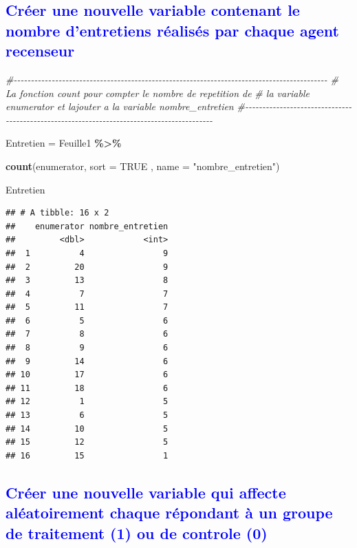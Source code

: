 \documentclass[
]{article}
\newenvironment{Shaded}{\begin{snugshade}}{\end{snugshade}}
\newcommand{\AttributeTok}[1]{\textcolor[rgb]{0.13,0.29,0.53}{#1}}
\newcommand{\CommentTok}[1]{\textcolor[rgb]{0.56,0.35,0.01}{\textit{#1}}}
\newcommand{\ConstantTok}[1]{\textcolor[rgb]{0.56,0.35,0.01}{#1}}
\newcommand{\FunctionTok}[1]{\textcolor[rgb]{0.13,0.29,0.53}{\textbf{#1}}}
\newcommand{\NormalTok}[1]{#1}
\newcommand{\OtherTok}[1]{\textcolor[rgb]{0.56,0.35,0.01}{#1}}
\newcommand{\SpecialCharTok}[1]{\textcolor[rgb]{0.81,0.36,0.00}{\textbf{#1}}}
\newcommand{\StringTok}[1]{\textcolor[rgb]{0.31,0.60,0.02}{#1}}
\begin{document}
\textcolor{blue}{\subsection{Créer une nouvelle variable contenant le nombre d’entretiens réalisés par chaque agent recenseur}}

\begin{Shaded}
\begin{Highlighting}[]
\CommentTok{\#{-}{-}{-}{-}{-}{-}{-}{-}{-}{-}{-}{-}{-}{-}{-}{-}{-}{-}{-}{-}{-}{-}{-}{-}{-}{-}{-}{-}{-}{-}{-}{-}{-}{-}{-}{-}{-}{-}{-}{-}{-}{-}{-}{-}{-}{-}{-}{-}{-}{-}{-}{-}{-}{-}{-}{-}{-}{-}{-}{-}{-}{-}{-}{-}{-}{-}{-}{-}{-}{-}{-}{-}{-}{-}{-}{-}{-}{-}{-}{-}{-}{-}{-}{-}{-}{-}{-}{-}{-}{-}{-}}
\CommentTok{\#   La fonction count pour compter le nombre de repetition de }
\CommentTok{\#   la variable enumerator et l\textquotesingle{}ajouter a la variable nombre\_entretien}
\CommentTok{\#{-}{-}{-}{-}{-}{-}{-}{-}{-}{-}{-}{-}{-}{-}{-}{-}{-}{-}{-}{-}{-}{-}{-}{-}{-}{-}{-}{-}{-}{-}{-}{-}{-}{-}{-}{-}{-}{-}{-}{-}{-}{-}{-}{-}{-}{-}{-}{-}{-}{-}{-}{-}{-}{-}{-}{-}{-}{-}{-}{-}{-}{-}{-}{-}{-}{-}{-}{-}{-}{-}{-}{-}{-}{-}{-}{-}{-}{-}{-}{-}{-}{-}{-}{-}{-}{-}{-}{-}{-}{-}{-}}

\NormalTok{Entretien }\OtherTok{=}\NormalTok{ Feuille1 }\SpecialCharTok{\%\textgreater{}\%}
  
\FunctionTok{count}\NormalTok{(enumerator, }\AttributeTok{sort =} \ConstantTok{TRUE}\NormalTok{ , }\AttributeTok{name =} \StringTok{"nombre\_entretien"}\NormalTok{)}

\NormalTok{Entretien}
\end{Highlighting}
\end{Shaded}

\begin{verbatim}
## # A tibble: 16 x 2
##    enumerator nombre_entretien
##         <dbl>            <int>
##  1          4                9
##  2         20                9
##  3         13                8
##  4          7                7
##  5         11                7
##  6          5                6
##  7          8                6
##  8          9                6
##  9         14                6
## 10         17                6
## 11         18                6
## 12          1                5
## 13          6                5
## 14         10                5
## 15         12                5
## 16         15                1
\end{verbatim}

\textcolor{blue}{\subsection{Créer une nouvelle variable qui affecte aléatoirement chaque répondant à un groupe de traitement (1) ou
de controle (0)}}
\end{document}
